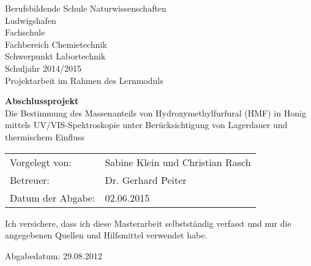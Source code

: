 \documentclass[%
11pt,                               %
liststotoc,                 %
bibtotoc,                       %
]{scrreprt}
\begin{document}
\pagestyle{empty} %
\setlength{\parindent}{0cm}

\begin{titlepage}
  \begin{center}
    \vspace*{2cm}
      \Large{Berufsbildende Schule Naturwissenschaften}\\
      \smallskip
      \Large{Ludwigshafen}\\
      \smallskip
      \Large{Fachschule}\\
      \smallskip
      \Large{Fachbereich Chemietechnik}\\
      \smallskip
      \Large{Schwerpunkt Labortechnik}\\
      \smallskip
      \Large{Schuljahr 2014/2015}\\
      \smallskip
      \Large{Projektarbeit im Rahmen des Lernmoduls}
      \smallskip

    \vspace{1cm}

    \vspace{0.5\baselineskip} {\Huge \textbf{Abschlussprojekt}\\\vspace{2cm} \huge Die Bestimmung des Massenanteils von Hydroxymethylfurfural (HMF) in Honig mittels UV/VIS-Spektroskopie unter Berücksichtigung von Lagerdauer und thermischem Einfluss}
  \end{center}

  \vfill

  {\large
    \begin{tabular}[l]{ll}
      Vorgelegt von: & Sabine Klein und Christian Rasch\\
      Betreuer: & Dr. Gerhard Peiter\\
      Datum der Abgabe: & 02.06.2015
    \end{tabular}
  }

\end{titlepage}

\thispagestyle{empty}

\vspace*{100pt} Ich versichere, dass ich diese Masterarbeit selbstst\"andig verfasst und nur die
angegebenen Quellen und Hilfsmittel verwendet habe.

\vspace*{50pt}


Abgabedatum: 29.08.2012 \newpage

\end{document}
